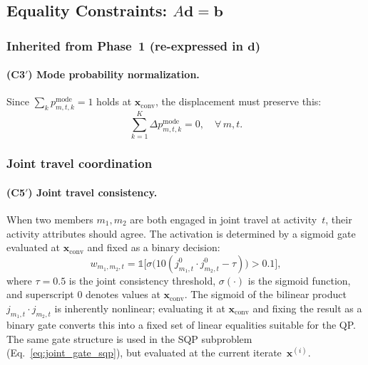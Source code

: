 \documentclass[11pt,a4paper]{article}
\newcommand{\indicator}{\mathbb{1}}
\newcommand{\xconv}{\mathbf{x}_{\mathrm{conv}}}
\begin{document}
\subsection{Equality Constraints: $A\mathbf{d} = \mathbf{b}$}

\subsubsection*{Inherited from Phase~1 (re-expressed in $\mathbf{d}$)}

\paragraph{(C3$'$) Mode probability normalization.}
Since $\sum_k p^{\mathrm{mode}}_{m,t,k} = 1$ holds at $\xconv$, the displacement must preserve this:
\begin{equation}
    \sum_{k=1}^{K} \Delta p^{\mathrm{mode}}_{m,t,k} = 0, \quad \forall\, m, t.
    \label{eq:mode_norm_d}
\end{equation}

\subsubsection*{Joint travel coordination}

\paragraph{(C5$'$) Joint travel consistency.}
When two members $m_1, m_2$ are both engaged in joint travel at activity~$t$, their activity attributes should agree.
The activation is determined by a sigmoid gate evaluated at $\xconv$ and fixed as a binary decision:
\begin{equation}
    w_{m_1,m_2,t} = \indicator\!\bigl[\sigma\!\bigl(10(j_{m_1,t}^0 \cdot j_{m_2,t}^0 - \tau)\bigr) > 0.1\bigr],
    \label{eq:joint_gate_d}
\end{equation}
where $\tau = 0.5$ is the joint consistency threshold, $\sigma(\cdot)$ is the sigmoid function, and superscript $0$ denotes values at $\xconv$.
The sigmoid of the bilinear product $j_{m_1,t} \cdot j_{m_2,t}$ is inherently nonlinear; evaluating it at $\xconv$ and fixing the result as a binary gate converts this into a fixed set of linear equalities suitable for the QP.
The same gate structure is used in the SQP subproblem (Eq.~\ref{eq:joint_gate_sqp}), but evaluated at the current iterate~$\mathbf{x}^{(i)}$.
\end{document}
